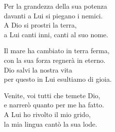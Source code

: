 

\spazio

\strofa Per la grandezza della sua potenza\\
davanti a Lui si piegano i nemici.\\
A Dio si prostri la terra,\\
a Lui canti inni, canti al suo nome.

\spazio


\spazio

\strofa Il mare ha cambiato in terra ferma,\\
con la sua forza regnerà in eterno.\\
Dio salvi la nostra vita\\
per questo in Lui esultiamo di gioia.

\spazio


\spazio

\strofa Venite, voi tutti che temete Dio,\\
e narrerò quanto per me ha fatto.\\
A Lui ho rivolto il mio grido,\\
la mia lingua cantò la sua lode.

\spazio

